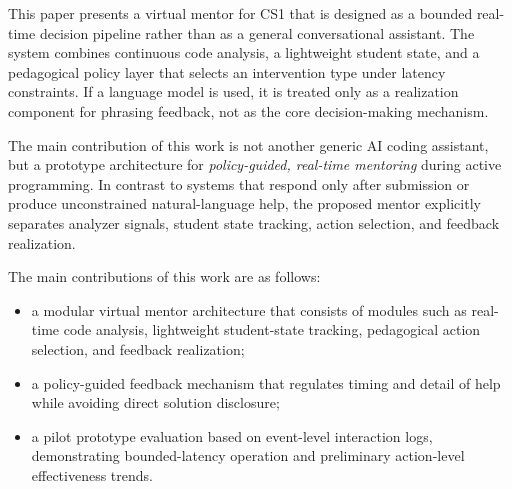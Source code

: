 \documentclass[conference]{IEEEtran}
\begin{document}
This paper presents a virtual mentor for CS1 that is designed as a bounded real-time decision pipeline rather than as a general conversational assistant. The system combines continuous code analysis, a lightweight student state, and a pedagogical policy layer that selects an intervention type under latency constraints. If a language model is used, it is treated only as a realization component for phrasing feedback, not as the core decision-making mechanism.

The main contribution of this work is not another generic AI coding assistant, but a prototype architecture for \emph{policy-guided, real-time mentoring} during active programming. In contrast to systems that respond only after submission or produce unconstrained natural-language help, the proposed mentor explicitly separates analyzer signals, student state tracking, action selection, and feedback realization.

The main contributions of this work are as follows:
\begin{itemize}
\item a modular virtual mentor architecture that consists of modules such as real-time code analysis, lightweight student-state tracking, pedagogical action selection, and feedback realization; 
\item a policy-guided feedback mechanism that regulates timing and detail of help while avoiding direct solution disclosure; 
\item a pilot prototype evaluation based on event-level interaction logs, demonstrating bounded-latency operation and preliminary action-level effectiveness trends.
\end{itemize}
\end{document}
